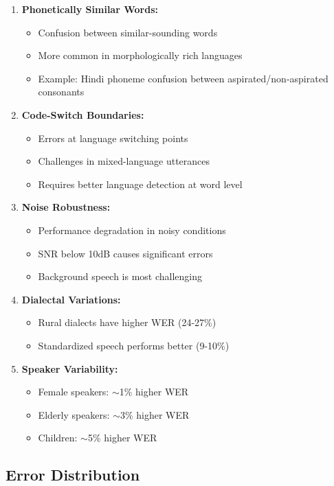 \documentclass[12pt,a4paper]{article}
\begin{document}
\begin{enumerate}[leftmargin=*]
\item \textbf{Phonetically Similar Words:}
  \begin{itemize}
  \item Confusion between similar-sounding words
  \item More common in morphologically rich languages
  \item Example: Hindi phoneme confusion between aspirated/non-aspirated consonants
  \end{itemize}

\item \textbf{Code-Switch Boundaries:}
  \begin{itemize}
  \item Errors at language switching points
  \item Challenges in mixed-language utterances
  \item Requires better language detection at word level
  \end{itemize}

\item \textbf{Noise Robustness:}
  \begin{itemize}
  \item Performance degradation in noisy conditions
  \item SNR below 10dB causes significant errors
  \item Background speech is most challenging
  \end{itemize}

\item \textbf{Dialectal Variations:}
  \begin{itemize}
  \item Rural dialects have higher WER (24-27\%)
  \item Standardized speech performs better (9-10\%)
  \end{itemize}

\item \textbf{Speaker Variability:}
  \begin{itemize}
  \item Female speakers: $\sim$1\% higher WER
  \item Elderly speakers: $\sim$3\% higher WER
  \item Children: $\sim$5\% higher WER
  \end{itemize}
\end{enumerate}

\subsection{Error Distribution}
\end{document}
